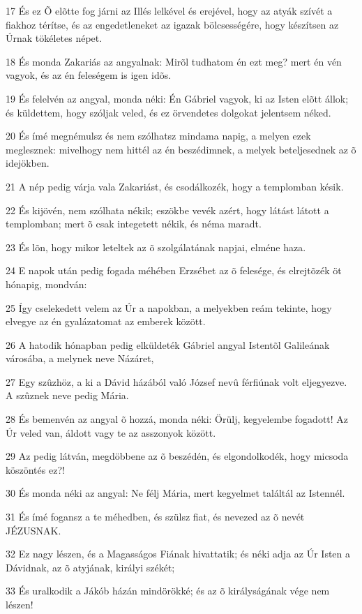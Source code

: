 \par 17 És ez Õ elõtte fog járni az Illés lelkével és erejével, hogy az atyák szívét a fiakhoz térítse, és az engedetleneket az igazak bölcsességére, hogy készítsen az Úrnak tökéletes népet.
\par 18 És monda Zakariás az angyalnak: Mirõl tudhatom én ezt meg? mert én vén vagyok, és az én feleségem is igen idõs.
\par 19 És felelvén az angyal, monda néki: Én Gábriel vagyok, ki az Isten elõtt állok; és küldettem, hogy szóljak veled, és ez örvendetes dolgokat jelentsem néked.
\par 20 És ímé megnémulsz és nem szólhatsz mindama napig, a melyen ezek meglesznek: mivelhogy nem hittél az én beszédimnek, a melyek beteljesednek az õ idejökben.
\par 21 A nép pedig várja vala Zakariást, és csodálkozék, hogy a templomban késik.
\par 22 És kijövén, nem szólhata nékik; eszökbe vevék azért, hogy látást látott a templomban; mert õ csak integetett nékik, és néma maradt.
\par 23 És lõn, hogy mikor leteltek az õ szolgálatának napjai, elméne haza.
\par 24 E napok után pedig fogada méhében Erzsébet az õ felesége, és elrejtõzék öt hónapig, mondván:
\par 25 Így cselekedett velem az Úr a napokban, a melyekben reám tekinte, hogy elvegye az én gyalázatomat az emberek között.
\par 26 A hatodik hónapban pedig elküldeték Gábriel angyal Istentõl Galileának városába, a melynek neve Názáret,
\par 27 Egy szûzhöz, a ki a Dávid házából való József nevû férfiúnak volt eljegyezve. A szûznek neve pedig Mária.
\par 28 És bemenvén az angyal õ hozzá, monda néki: Örülj, kegyelembe fogadott! Az Úr veled van, áldott vagy te az asszonyok között.
\par 29 Az pedig látván, megdöbbene az õ beszédén, és elgondolkodék, hogy micsoda köszöntés ez?!
\par 30 És monda néki az angyal: Ne félj Mária, mert kegyelmet találtál az Istennél.
\par 31 És ímé fogansz a te méhedben, és szülsz fiat, és nevezed az õ nevét  JÉZUSNAK.
\par 32 Ez nagy lészen, és a Magasságos Fiának hivattatik; és néki adja az Úr Isten a Dávidnak, az õ atyjának, királyi székét;
\par 33 És uralkodik a Jákób házán mindörökké; és az õ királyságának vége nem lészen!
